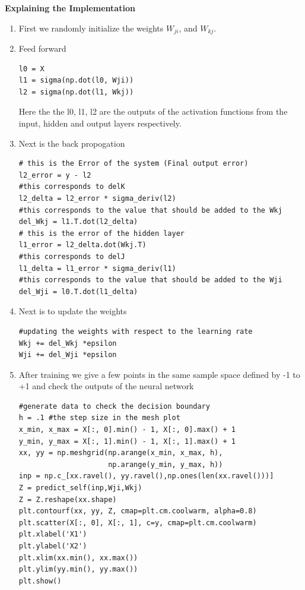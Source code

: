 \documentclass[10pt, letterpaper]{article}
\begin{document}
\textbf{Explaining the Implementation}
\begin{enumerate} 
\item First we randomly initialize the weights $W_{ji}$, and $W_{kj}$.
\item Feed forward
\begin{verbatim}
l0 = X
l1 = sigma(np.dot(l0, Wji))
l2 = sigma(np.dot(l1, Wkj))
\end{verbatim}
Here the the l0, l1, l2 are the outputs of the activation functions from the input,  hidden and output layers respectively.
\item Next is the back propogation
\begin{verbatim}
# this is the Error of the system (Final output error)
l2_error = y - l2 
#this corresponds to delK
l2_delta = l2_error * sigma_deriv(l2)
#this corresponds to the value that should be added to the Wkj
del_Wkj = l1.T.dot(l2_delta)
# this is the error of the hidden layer
l1_error = l2_delta.dot(Wkj.T)
#this corresponds to delJ
l1_delta = l1_error * sigma_deriv(l1)
#this corresponds to the value that should be added to the Wji
del_Wji = l0.T.dot(l1_delta)
\end{verbatim}
\item Next is to update the weights
\begin{verbatim}
#updating the weights with respect to the learning rate
Wkj += del_Wkj *epsilon
Wji += del_Wji *epsilon
\end{verbatim}

\item After training we give a few points in the same sample space defined by -1 to +1 and check the outputs of the neural network
\begin{verbatim}
#generate data to check the decision boundary
h = .1 #the step size in the mesh plot
x_min, x_max = X[:, 0].min() - 1, X[:, 0].max() + 1
y_min, y_max = X[:, 1].min() - 1, X[:, 1].max() + 1
xx, yy = np.meshgrid(np.arange(x_min, x_max, h),
                     np.arange(y_min, y_max, h))
inp = np.c_[xx.ravel(), yy.ravel(),np.ones(len(xx.ravel()))]
Z = predict_self(inp,Wji,Wkj)
Z = Z.reshape(xx.shape)
plt.contourf(xx, yy, Z, cmap=plt.cm.coolwarm, alpha=0.8)
plt.scatter(X[:, 0], X[:, 1], c=y, cmap=plt.cm.coolwarm)
plt.xlabel('X1')
plt.ylabel('X2')
plt.xlim(xx.min(), xx.max())
plt.ylim(yy.min(), yy.max())
plt.show()
\end{verbatim}

\end{enumerate}
\end{document}
